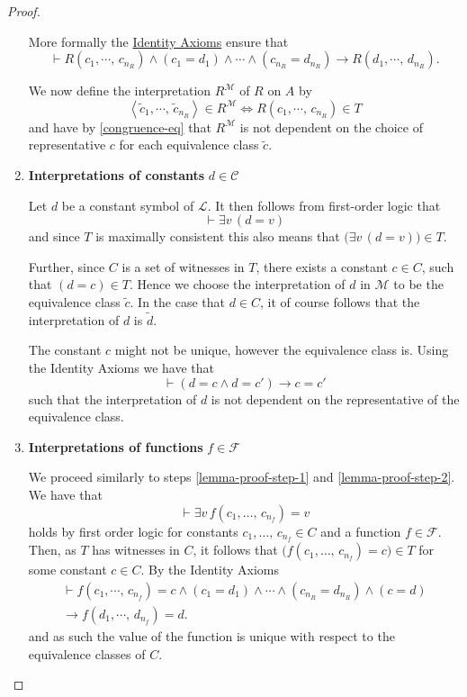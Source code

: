 \documentclass[../../main.tex]{subfiles}
\begin{document}
\begin{proof}
\begin{enumerate}
        More formally the \hyperref[identity-axioms]{Identity Axioms} ensure that
        $$\vdash R(c_1,\cdots,\,c_{n_R}) \wedge (c_1 = d_1) \wedge \cdots \wedge (c_{n_R} = d_{n_R}) \rightarrow R(d_1,\cdots,\,d_{n_R}).$$

        We now define the interpretation $R^\mathcal{M}$ of $R$ on $A$ by
        $$\left<\tilde{c}_1,\cdots,\,\tilde{c}_{n_R}\right> \in R^\mathcal{M} \iff R(c_1,\cdots,\,c_{n_R}) \in T$$
        and have by \eqref{congruence-eq} that $R^\mathcal{M}$ is not dependent on the choice of representative $c$ for each equivalence class $\tilde{c}$.

        \item \label{lemma-proof-step-2} \textbf{Interpretations of constants} $d \in \mathcal{C}$
        
        Let $d$ be a constant symbol of $\mathcal{L}$.
        It then follows from first-order logic that 
        $$\vdash \exists v \, (d = v)$$
        and since $T$ is maximally consistent this also means that $\big(\exists v \, (d = v)\big) \in T$.
        
        Further, since $C$ is a set of witnesses in $T$, there exists a constant $c \in C$, such that $(d = c) \in T$.
        Hence we choose the interpretation of $d$ in $\mathcal{M}$ to be the equivalence class $\tilde{c}$.
        In the case that $d \in C$, it of course follows that the interpretation of $d$ is $\tilde{d}$.

        The constant $c$ might not be unique, however the equivalence class is.
        Using the Identity Axioms we have that
        $$\vdash (d = c \wedge d = c') \rightarrow c = c'$$
        such that the interpretation of $d$ is not dependent on the representative of the equivalence class.

        \item \label{lemma-proof-step-3}\textbf{Interpretations of functions} $f \in \mathcal{F}$
        
        We proceed similarly to steps \ref{lemma-proof-step-1} and \ref{lemma-proof-step-2}.
        We have that
        $$\vdash \exists v\, f(c_1,\ldots,\, c_{n_f}) = v$$
        holds by first order logic for constants $c_1,\ldots,\, c_{n_f} \in C$ and a function $f \in \mathcal{F}$.
        Then, as $T$ has witnesses in $C$, it follows that $\big(f(c_1,\ldots,\, c_{n_f}) = c\big) \in T$ for some constant $c \in C$.
        By the Identity Axioms
        \begin{multline}\label{function-congruence-eq}
            \vdash f(c_1,\cdots,\,c_{n_f}) = c \wedge (c_1 = d_1) \wedge \cdots \wedge (c_{n_R} = d_{n_R}) \wedge (c = d) \\
            \rightarrow f(d_1,\cdots,\,d_{n_f})= d.
        \end{multline}
        and as such the value of the function is unique with respect to the equivalence classes of $C$.


\end{enumerate}
\end{proof}
\end{document}
